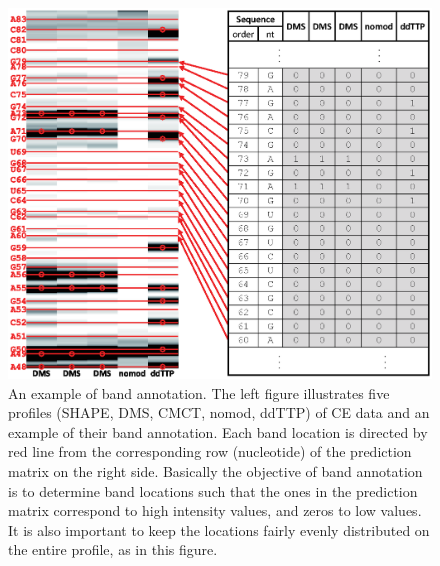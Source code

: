 \documentclass[letter]{bioinfo}
\begin{document}
\begin{figure}
\centering
\includegraphics[width=\linewidth]{figures/FigureS1}
\caption{An example of band annotation. The left figure illustrates five profiles (SHAPE, DMS, CMCT, nomod, ddTTP) of CE data and an example of their band annotation. Each band location is directed by red line from the corresponding row (nucleotide) of the prediction matrix on the right side. Basically the objective of band annotation is to determine band locations such that the ones in the prediction matrix correspond to high intensity values, and zeros to low values. It is also important to keep the locations fairly evenly distributed on the entire profile, as in this figure.}
\label{f:old_vs_new}
\end{figure}
\end{document}
